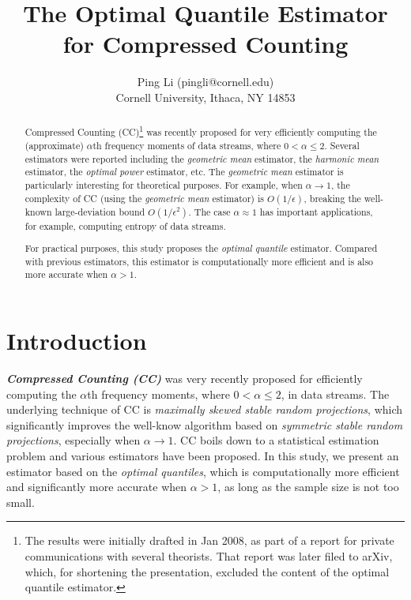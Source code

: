 \documentclass[oneside,10pt]{article}
\begin{document}
\title{The Optimal Quantile Estimator for Compressed Counting}


\author{ Ping Li \hspace{0.01in} (pingli@cornell.edu) \hspace{0.2in} \\
       Cornell University,  Ithaca, NY 14853
  }
\date{}
\maketitle


\begin{abstract}
Compressed Counting (CC)\footnote{The results  were initially drafted in Jan 2008, as part of a report for private communications with several theorists. That report was later filed to arXiv\cite{Article:Li_CC_v0}, which, for shortening the presentation, excluded the content of the optimal quantile estimator. }
was recently proposed for very efficiently computing the (approximate) $\alpha$th frequency moments of data streams, where $0<\alpha \leq 2$. Several estimators were reported including the {\em geometric mean} estimator, the {\em harmonic mean} estimator, the {\em optimal power} estimator, etc. The {\em geometric mean} estimator is particularly interesting for theoretical purposes. For example, when $\alpha\rightarrow 1$, the complexity of CC (using the {\em geometric mean} estimator) is $O\left(1/\epsilon\right)$, breaking the well-known large-deviation bound $O\left(1/\epsilon^2\right)$. The case $\alpha\approx 1$ has  important applications, for example, computing entropy of data streams.

For practical purposes, this study proposes the {\em optimal quantile} estimator. Compared with previous estimators, this estimator is computationally more efficient and is also more accurate when $\alpha> 1$.

\end{abstract}


\section{Introduction}

\textbf{\em Compressed Counting (CC)}\cite{Article:Li_CC,Article:Li_CC_v0} was very recently proposed for efficiently computing the $\alpha$th frequency moments, where $0<\alpha\leq2$, in data streams. The underlying technique of CC is {\em maximally skewed stable random projections}, which significantly improves the well-know algorithm based on {\em symmetric stable random projections}\cite{Article:Indyk_JACM06,Proc:Li_SODA08}, especially when $\alpha\rightarrow 1$. CC boils down to a statistical estimation problem and various estimators have been  proposed\cite{Article:Li_CC,Article:Li_CC_v0}. In this study, we present an estimator based on the {\em optimal quantiles}, which is computationally more efficient and significantly more accurate when $\alpha> 1$, as long as the sample size is not too small.
\end{document}

